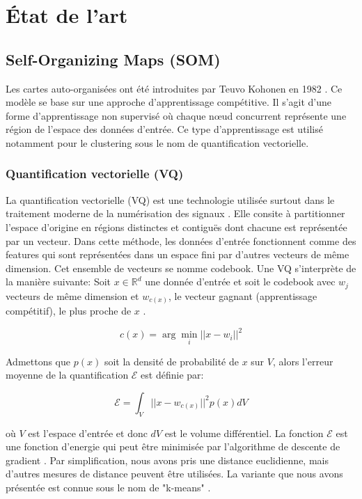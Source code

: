 \documentclass[12pt,a4paper]{report}
\begin{document}

\chapter{État de l'art}

\section{Self-Organizing Maps (SOM)}

Les cartes auto-organisées ont été introduites par Teuvo Kohonen en 1982 \cite{SurveySOM}. 
Ce modèle se base sur une approche d'apprentissage compétitive. Il s'agit d'une forme d'apprentissage non supervisé
où chaque nœud concurrent représente une région de l'espace des données d'entrée. 
Ce type d'apprentissage est utilisé notamment pour le clustering sous le nom de quantification vectorielle.

\subsection{Quantification vectorielle (VQ)} \label{sec:VQ}
La quantification vectorielle (VQ) est une technologie utilisée surtout dans le traitement moderne de la numérisation des signaux \cite{Kohonen2012SOM}.
Elle consite à partitionner l'espace d'origine en régions distinctes et contiguës dont chacune est représentée par un vecteur.
Dans cette méthode, les données d'entrée fonctionnent comme des features qui sont représentées dans un espace fini par 
d'autres vecteurs de même dimension. Cet ensemble de vecteurs se nomme codebook. 
Une VQ s'interprète de la manière suivante: Soit $x \in \mathbb{R}^d$ une donnée d'entrée et soit le codebook avec $w_j$ vecteurs de même dimension et $w_{c(x)}$, le vecteur gagnant (apprentissage compétitif),
le plus proche de $x$ \cite{SOM1990}.

$$ c(x) = \arg\min_{i} ||x - w_i||^2 $$

Admettons que $p(x)$ soit la densité de probabilité de $x$ sur $V$, alors l'erreur moyenne de la quantification $\mathcal{E}$ est définie par:

\begin{equation}
    \mathcal{E} = \int_V ||x - w_{c(x)}||^2 p(x) dV
    \label{eq:quant_E}
\end{equation}

où $V$ est l'espace d'entrée et donc $dV$ est le volume différentiel. La fonction $\mathcal{E}$ est une fonction d'energie qui peut être minimisée par 
l'algorithme de descente de gradient \cite{Kohonen2012SOM}. Par simplification, nous avons pris une distance euclidienne, mais d'autres mesures de distance peuvent être utilisées.
La variante que nous avons présentée est connue sous le nom de "k-means" \cite{bishop2006chapter9}.
\end{document}
